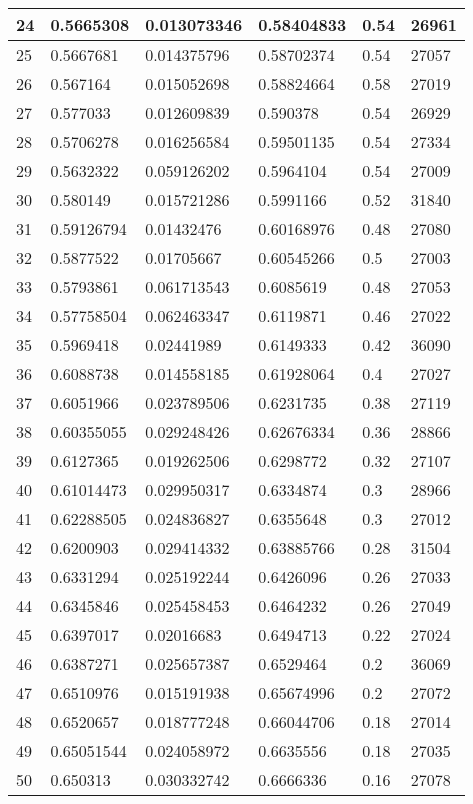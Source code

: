 \begin{longtable}{|l|l|l|l|l|l|}
24 & 0.5665308 & 0.013073346 & 0.58404833 & 0.54 & 26961 \\ \hline 
25 & 0.5667681 & 0.014375796 & 0.58702374 & 0.54 & 27057 \\ \hline 
26 & 0.567164 & 0.015052698 & 0.58824664 & 0.58 & 27019 \\ \hline 
27 & 0.577033 & 0.012609839 & 0.590378 & 0.54 & 26929 \\ \hline 
28 & 0.5706278 & 0.016256584 & 0.59501135 & 0.54 & 27334 \\ \hline 
29 & 0.5632322 & 0.059126202 & 0.5964104 & 0.54 & 27009 \\ \hline 
30 & 0.580149 & 0.015721286 & 0.5991166 & 0.52 & 31840 \\ \hline 
31 & 0.59126794 & 0.01432476 & 0.60168976 & 0.48 & 27080 \\ \hline 
32 & 0.5877522 & 0.01705667 & 0.60545266 & 0.5 & 27003 \\ \hline 
33 & 0.5793861 & 0.061713543 & 0.6085619 & 0.48 & 27053 \\ \hline 
34 & 0.57758504 & 0.062463347 & 0.6119871 & 0.46 & 27022 \\ \hline 
35 & 0.5969418 & 0.02441989 & 0.6149333 & 0.42 & 36090 \\ \hline 
36 & 0.6088738 & 0.014558185 & 0.61928064 & 0.4 & 27027 \\ \hline 
37 & 0.6051966 & 0.023789506 & 0.6231735 & 0.38 & 27119 \\ \hline 
38 & 0.60355055 & 0.029248426 & 0.62676334 & 0.36 & 28866 \\ \hline 
39 & 0.6127365 & 0.019262506 & 0.6298772 & 0.32 & 27107 \\ \hline 
40 & 0.61014473 & 0.029950317 & 0.6334874 & 0.3 & 28966 \\ \hline 
41 & 0.62288505 & 0.024836827 & 0.6355648 & 0.3 & 27012 \\ \hline 
42 & 0.6200903 & 0.029414332 & 0.63885766 & 0.28 & 31504 \\ \hline 
43 & 0.6331294 & 0.025192244 & 0.6426096 & 0.26 & 27033 \\ \hline 
44 & 0.6345846 & 0.025458453 & 0.6464232 & 0.26 & 27049 \\ \hline 
45 & 0.6397017 & 0.02016683 & 0.6494713 & 0.22 & 27024 \\ \hline 
46 & 0.6387271 & 0.025657387 & 0.6529464 & 0.2 & 36069 \\ \hline 
47 & 0.6510976 & 0.015191938 & 0.65674996 & 0.2 & 27072 \\ \hline 
48 & 0.6520657 & 0.018777248 & 0.66044706 & 0.18 & 27014 \\ \hline 
49 & 0.65051544 & 0.024058972 & 0.6635556 & 0.18 & 27035 \\ \hline 
50 & 0.650313 & 0.030332742 & 0.6666336 & 0.16 & 27078 \\ \hline 
\end{longtable}